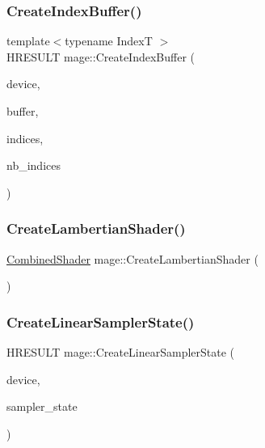 \hypertarget{namespacemage_a4e0e92d226276caabacbf11aceab060b}{}\label{namespacemage_a4e0e92d226276caabacbf11aceab060b} 
\subsubsection{\texorpdfstring{Create\+Index\+Buffer()}{CreateIndexBuffer()}}
{\footnotesize\ttfamily template$<$typename IndexT $>$ \\
H\+R\+E\+S\+U\+LT mage\+::\+Create\+Index\+Buffer (\begin{DoxyParamCaption}\item[{\hyperlink{namespacemage_ae74f374780900893caa5555d1031fd79}{Com\+Ptr}$<$ I\+D3\+D11\+Device2 $>$}]{device,  }\item[{I\+D3\+D11\+Buffer $\ast$$\ast$}]{buffer,  }\item[{const IndexT $\ast$}]{indices,  }\item[{size\+\_\+t}]{nb\+\_\+indices }\end{DoxyParamCaption})}

\hypertarget{namespacemage_ab0bd21012fa29244f0f9b3201bebc2a5}{}\label{namespacemage_ab0bd21012fa29244f0f9b3201bebc2a5} 
\subsubsection{\texorpdfstring{Create\+Lambertian\+Shader()}{CreateLambertianShader()}}
{\footnotesize\ttfamily \hyperlink{structmage_1_1_combined_shader}{Combined\+Shader} mage\+::\+Create\+Lambertian\+Shader (\begin{DoxyParamCaption}{ }\end{DoxyParamCaption})}

\hypertarget{namespacemage_aa74f1b3d53951f4d3f6323a5490ac953}{}\label{namespacemage_aa74f1b3d53951f4d3f6323a5490ac953} 
\subsubsection{\texorpdfstring{Create\+Linear\+Sampler\+State()}{CreateLinearSamplerState()}}
{\footnotesize\ttfamily H\+R\+E\+S\+U\+LT mage\+::\+Create\+Linear\+Sampler\+State (\begin{DoxyParamCaption}\item[{\hyperlink{namespacemage_ae74f374780900893caa5555d1031fd79}{Com\+Ptr}$<$ I\+D3\+D11\+Device2 $>$}]{device,  }\item[{I\+D3\+D11\+Sampler\+State $\ast$$\ast$}]{sampler\+\_\+state }\end{DoxyParamCaption})}

